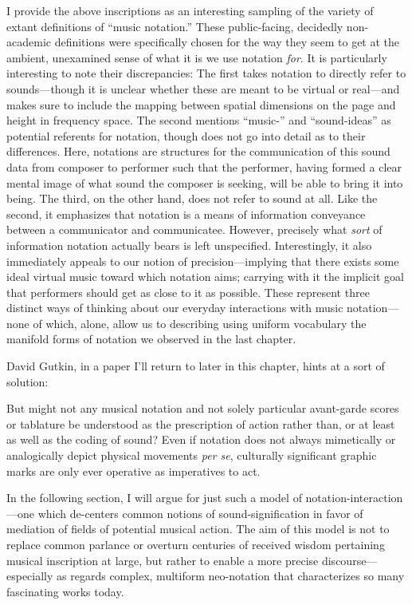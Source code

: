     I provide the above inscriptions as an interesting  sampling of the variety of extant definitions of ``music notation.'' These public-facing, decidedly non-academic definitions were specifically chosen for the way they seem to get at the ambient, unexamined sense of what it is we use notation \textit{for}. It is particularly interesting to note their discrepancies: The first takes notation to directly refer to sounds---though it is unclear whether these are meant to be virtual or real---and makes sure to include the mapping between spatial dimensions on the page and height in frequency space. The second mentions ``music-'' and ``sound-ideas'' as potential referents for notation, though does not go into detail as to their differences. Here, notations are structures for the communication of this sound data from composer to performer such that the performer, having formed a clear mental image of what sound the composer is seeking, will be able to bring it into being. The third, on the other hand, does not refer to sound at all. Like the second, it emphasizes that notation is a means of information conveyance between a communicator and communicatee. However, precisely what \textit{sort} of information notation actually bears is left unspecified. Interestingly, it also immediately appeals to our notion of precision---implying that there exists some ideal virtual music toward which notation aims; carrying with it the implicit goal that performers should get as close to it as possible. These represent three distinct ways of thinking about our everyday interactions with music notation---none of which, alone, allow us to describing using uniform vocabulary the manifold forms of notation we observed in the last chapter.
    
    David Gutkin, in a paper I'll return to later in this chapter, hints at a sort of solution:

        \begin{smallquote}
            But might not any musical notation and not solely particular avant-garde scores or tablature be understood as the prescription of action rather than, or at least as well as the coding of sound? Even if notation does not always mimetically or analogically depict physical movements \textit{per se}, culturally significant graphic marks are only ever operative as imperatives to act.\autocite{Gutkin}
        \end{smallquote}

    In the following section, I will argue for just such a model of notation-interaction---one which de-centers common notions of sound-signification in favor of mediation of fields of potential musical action. The aim of this model is not to replace common parlance or overturn centuries of received wisdom pertaining musical inscription at large, but rather to enable a more precise discourse---especially as regards complex, multiform neo-notation that characterizes so many fascinating works today. 
    
